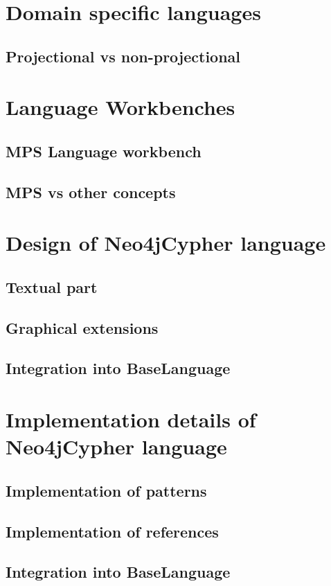 \chapter{Domain specific languages}

\section{Projectional vs non-projectional}



\chapter{Language Workbenches}

\section{MPS Language workbench}

\section{MPS vs other concepts}



\chapter{Design of Neo4jCypher language}

\section{Textual part}

\section{Graphical extensions}

\section{Integration into BaseLanguage}



\chapter{Implementation details of Neo4jCypher language}

\section{Implementation of patterns}

\section{Implementation of references}

\section{Integration into BaseLanguage}